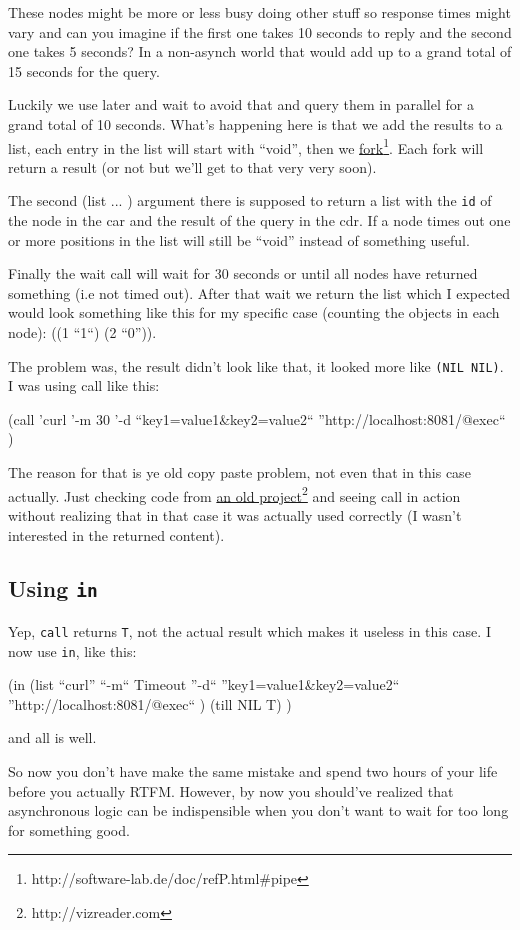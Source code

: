 These nodes might be more or less busy doing other stuff so response
times might vary and can you imagine if the first one takes 10 seconds
to reply and the second one takes 5 seconds? In a non-asynch world
that would add up to a grand total of 15 seconds for the query.

Luckily we use later and wait to avoid that and query them in parallel
for a grand total of 10 seconds. What's happening here is that we add
the results to a list, each entry in the list will start with
``void'', then we
\underline{fork}\footnote{http://software-lab.de/doc/refP.html\#pipe}.
Each fork will return a result (or not but we'll get to that very very
soon).

The second (list ... ) argument there is supposed to return a list
with the \texttt{id} of the node in the car and the result of the
query in the cdr. If a node times out one or more positions in the
list will still be ``void'' instead of something useful.

Finally the wait call will wait for 30 seconds or until all nodes have
returned something (i.e not timed out). After that wait we return the
list which I expected would look something like this for my specific
case (counting the objects in each node): ((1 ``1``) (2 ``0'')).

The problem was, the result didn't look like that, it looked more like
\texttt{(NIL NIL)}. I was using call like this: 

\begin{wideverbatim}
(call 'curl '-m 30 '-d
   ``key1=value1\&key2=value2`` ''http://localhost:8081/@exec`` )
\end{wideverbatim}

The reason for that is ye old copy paste problem, not even that in
this case actually. Just checking code from \underline{an old
  project}\footnote{http://vizreader.com} and seeing call in action
without realizing that in that case it was actually used correctly (I
wasn't interested in the returned content).

\subsection{Using \texttt{in}}
\label{sec:bla}

Yep, \texttt{call} returns \texttt{T}, not the actual result which
makes it useless in this case. I now use \texttt{in}, like this: 

\begin{wideverbatim}
(in (list ``curl'' ``-m`` Timeout ''-d`` ''key1=value1\&key2=value2``
       ''http://localhost:8081/@exec`` ) (till NIL T) ) 
\end{wideverbatim}

and all is well.

So now you don't have make the same mistake and spend two hours of
your life before you actually RTFM. However, by now you should've
realized that asynchronous logic can be indispensible when you don't
want to wait for too long for something good.


